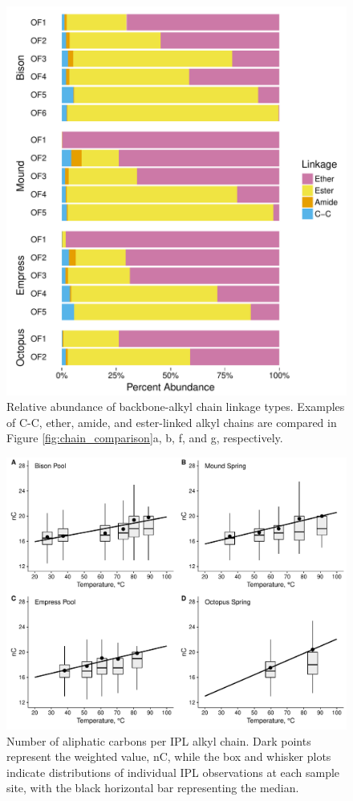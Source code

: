 \singlespace
\begin{figure}[h]
\centering
\includegraphics[width=.75\linewidth]{"figs_ch1/barplot - IPL chain linkage relative abundances"}
\caption[Relative abundance of backbone-alkyl chain linkage types]{Relative abundance of backbone-alkyl chain linkage types. Examples of C-C, ether, amide, and ester-linked alkyl chains are compared in Figure \ref{fig:chain_comparison}a, b, f, and g, respectively.}
\label{fig:IPL_linkage}
\end{figure}
\doublespace

\singlespace
\begin{figure}[h]
\centering
\includegraphics[width=1\linewidth]{"figs_ch1/boxplot - alkyl chain nC"}
\caption[Number of aliphatic carbons per IPL alkyl chain]{Number of aliphatic carbons per IPL alkyl chain. Dark points represent the weighted value, nC, while the box and whisker plots indicate distributions of individual IPL observations at each sample site, with the black horizontal bar representing the median.}
\label{fig:nC}
\end{figure}
\doublespace



